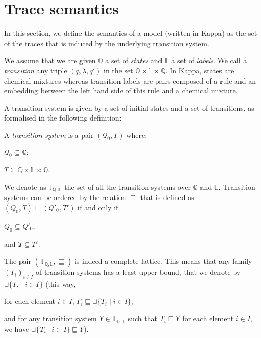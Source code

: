 \documentclass[10pt,a4paper]{llncs}
\newcommand{\signaturesymb}{\Sigma}
\newcommand{\states}{\mathbb{Q}}
\newcommand{\labels}{\mathbb{L}}
\newcommand{\transitionsystems}[1][\states,\labels]{\mathbb{T}_{#1}}
\newcommand{\beforesection}{\vspace*{-4pt}}
\renewcommand{\beforesection}{}
\begin{document}
\beforesection

\section{Trace semantics}

\beforesection

\label{sec:traces}
In this section, we define the semantics of a model (written in Kappa)  as the set of the traces that is induced by the underlying transition system.

We assume that we are given $\states$ a set of \emph{states} and $\labels$ a set of \emph{labels}. We call a \emph{transition} any triple $(q,\lambda,q')$ in the set $\states\times\labels\times\states$. In Kappa, states are chemical mixtures %
 whereas transition labels are pairs composed of a rule and an embedding between the left hand side of this rule and a chemical mixture.



A transition system is given by a set of initial states and a set of transitions, as formalised in the following definition:
\begin{definition}
\label{transitionsystem}
A \emph{transition system} is a pair $(\mathcal{Q}_0,T)$ where:
\begin{inparaenum}
  \item $\mathcal{Q}_0 \subseteq \states$; \item $T\subseteq \states\times \labels\times \states$.
\end{inparaenum}
\end{definition}


We denote as $\transitionsystems$ the set of all the transition systems over $\states$ and $\labels$.
Transition systems can be ordered by the relation $\sqsubseteq$ that is defined as
$(Q_0,T)\sqsubseteq (Q'_0, T')$ if and only if \begin{inparaenum}\item $Q_0 \subseteq Q'_0$, \item and $T\subseteq T'$. \end{inparaenum} The pair $(\transitionsystems,\sqsubseteq)$ is indeed a complete lattice. This means that any family $(T_i)_{i\in I}$  of transition systems has a least upper bound, that we denote by $\sqcup \{ T_i \;|\;i\in I\}$ (this way,  \begin{inparaenum}\item for each element $i\in I$, $T_i \sqsubseteq \sqcup \{T_i\;|\;i\in I\}$,
\item and for any transition system $Y\in\transitionsystems$ such that $T_i \sqsubseteq Y$ for each element $i\in I$, we have $\sqcup \{T_i\;|\;i\in I\} \sqsubseteq Y$).
\end{inparaenum}
\end{document}
